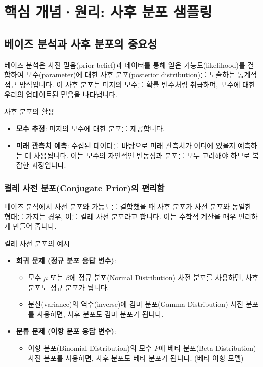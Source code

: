 \documentclass[11pt,a4paper]{article}
\begin{document}
\newpage
\section*{핵심 개념·원리: 사후 분포 샘플링}

\subsection*{베이즈 분석과 사후 분포의 중요성}
베이즈 분석은 사전 믿음(prior belief)과 데이터를 통해 얻은 가능도(likelihood)를 결합하여 모수(parameter)에 대한 사후 분포(posterior distribution)를 도출하는 통계적 접근 방식입니다. 이 사후 분포는 미지의 모수를 확률 변수처럼 취급하며, 모수에 대한 우리의 업데이트된 믿음을 나타냅니다.

\begin{mybox}{사후 분포의 활용}
\begin{itemize}
    \item \textbf{모수 추정}: 미지의 모수에 대한 분포를 제공합니다.
    \item \textbf{미래 관측치 예측}: 수집된 데이터를 바탕으로 미래 관측치가 어디에 있을지 예측하는 데 사용됩니다. 이는 모수의 자연적인 변동성과 분포를 모두 고려해야 하므로 복잡한 과정입니다.
\end{itemize}
\end{mybox}

\subsubsection*{켤레 사전 분포(Conjugate Prior)의 편리함}
베이즈 분석에서 사전 분포와 가능도를 결합했을 때 사후 분포가 사전 분포와 동일한 형태를 가지는 경우, 이를 켤레 사전 분포라고 합니다. 이는 수학적 계산을 매우 편리하게 만들어 줍니다.

\begin{examplebox}{켤레 사전 분포의 예시}
\begin{itemize}
    \item \textbf{회귀 문제 (정규 분포 응답 변수)}:
    \begin{itemize}
        \item 모수 $\mu$ 또는 $\beta$에 정규 분포(Normal Distribution) 사전 분포를 사용하면, 사후 분포도 정규 분포가 됩니다.
        \item 분산(variance)의 역수(inverse)에 감마 분포(Gamma Distribution) 사전 분포를 사용하면, 사후 분포도 감마 분포가 됩니다.
    \end{itemize}
    \item \textbf{분류 문제 (이항 분포 응답 변수)}:
    \begin{itemize}
        \item 이항 분포(Binomial Distribution)의 모수 $P$에 베타 분포(Beta Distribution) 사전 분포를 사용하면, 사후 분포도 베타 분포가 됩니다. (베타-이항 모델)
    \end{itemize}
\end{itemize}
\end{examplebox}
\end{document}
